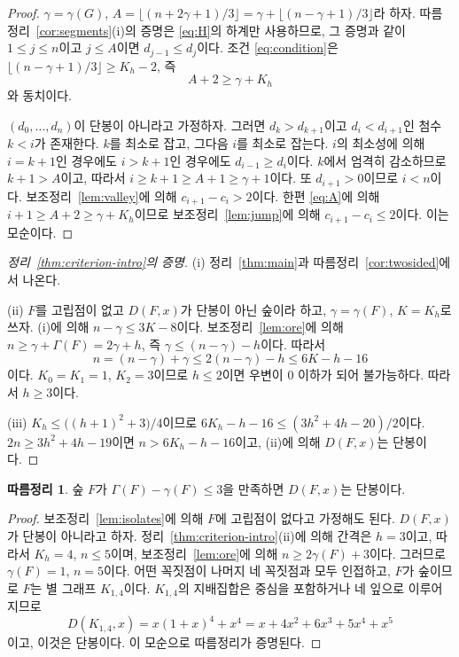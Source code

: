 \documentclass[11pt,a4paper]{article}
\theoremstyle{definition}
\newtheorem{corollary}[theorem]{따름정리}
\begin{document}
\begin{proof}
$\gamma=\gamma(G)$, $A=\lfloor(n+2\gamma+1)/3\rfloor
=\gamma+\lfloor(n-\gamma+1)/3\rfloor$라 하자. 따름정리~\ref{cor:segments}(i)의 증명은
\eqref{eq:H}의 하계만 사용하므로, 그 증명과 같이 $1\le j\le n$이고 $j\le A$이면
$d_{j-1}\le d_j$이다. 조건 \eqref{eq:condition}은
$\lfloor(n-\gamma+1)/3\rfloor\ge K_h-2$, 즉
\begin{equation}\label{eq:A}
  A+2\ge\gamma+K_h
\end{equation}
와 동치이다.

$(d_0,\dots,d_n)$이 단봉이 아니라고 가정하자. 그러면 $d_k>d_{k+1}$이고
$d_i<d_{i+1}$인 첨수 $k<i$가 존재한다. $k$를 최소로 잡고, 그다음 $i$를 최소로 잡는다.
$i$의 최소성에 의해 $i=k+1$인 경우에도 $i>k+1$인 경우에도 $d_{i-1}\ge d_i$이다. $k$에서
엄격히 감소하므로 $k+1>A$이고, 따라서 $i\ge k+1\ge A+1\ge\gamma+1$이다. 또
$d_{i+1}>0$이므로 $i<n$이다. 보조정리~\ref{lem:valley}에 의해 $c_{i+1}-c_i>2$이다.
한편 \eqref{eq:A}에 의해 $i+1\ge A+2\ge\gamma+K_h$이므로 보조정리~\ref{lem:jump}에 의해
$c_{i+1}-c_i\le2$이다. 이는 모순이다.
\end{proof}

\begin{proof}[정리~\ref{thm:criterion-intro}의 증명]
(i) 정리~\ref{thm:main}과 따름정리~\ref{cor:twosided}에서 나온다.

(ii) $F$를 고립점이 없고 $D(F,x)$가 단봉이 아닌 숲이라 하고, $\gamma=\gamma(F)$,
$K=K_h$로 쓰자. (i)에 의해 $n-\gamma\le 3K-8$이다. 보조정리~\ref{lem:ore}에 의해
$n\ge\gamma+\Gamma(F)=2\gamma+h$, 즉 $\gamma\le(n-\gamma)-h$이다. 따라서
\[
  n=(n-\gamma)+\gamma\le 2(n-\gamma)-h\le 6K-h-16
\]
이다. $K_0=K_1=1$, $K_2=3$이므로 $h\le2$이면 우변이 $0$ 이하가 되어 불가능하다. 따라서
$h\ge3$이다.

(iii) $K_h\le\bigl((h+1)^2+3\bigr)/4$이므로 $6K_h-h-16\le(3h^2+4h-20)/2$이다.
$2n\ge3h^2+4h-19$이면 $n>6K_h-h-16$이고, (ii)에 의해 $D(F,x)$는 단봉이다.
\end{proof}

\begin{corollary}\label{cor:gapthree}
숲 $F$가 $\Gamma(F)-\gamma(F)\le3$을 만족하면 $D(F,x)$는 단봉이다.
\end{corollary}

\begin{proof}
보조정리~\ref{lem:isolates}에 의해 $F$에 고립점이 없다고 가정해도 된다. $D(F,x)$가
단봉이 아니라고 하자. 정리~\ref{thm:criterion-intro}(ii)에 의해 간격은 $h=3$이고,
따라서 $K_h=4$, $n\le5$이며, 보조정리~\ref{lem:ore}에 의해 $n\ge2\gamma(F)+3$이다.
그러므로 $\gamma(F)=1$, $n=5$이다. 어떤 꼭짓점이 나머지 네 꼭짓점과 모두 인접하고,
$F$가 숲이므로 $F$는 별 그래프 $K_{1,4}$이다. $K_{1,4}$의 지배집합은 중심을 포함하거나
네 잎으로 이루어지므로
\[
  D(K_{1,4},x)=x(1+x)^4+x^4=x+4x^2+6x^3+5x^4+x^5
\]
이고, 이것은 단봉이다. 이 모순으로 따름정리가 증명된다.
\end{proof}
\end{document}
